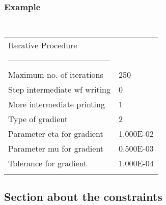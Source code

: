 \documentclass[a4paper,11pt]{article}
\begin{document}
\subsubsection*{Example}
\begin{center}
\tt
\begin{tabular}{|ll|}
\hline
Iterative Procedure           &          \\
-------------------------------------- & \\
Maximum no. of iterations     &250       \\
Step intermediate wf writing  &0         \\
More intermediate printing    &1         \\
Type of gradient              &2         \\
Parameter eta for gradient    &1.000E-02 \\
Parameter mu  for gradient    &0.500E-03 \\
Tolerance for gradient        &1.000E-04 \\
                              &          \\
\hline
\end{tabular}
\end{center}

%
%
\subsection{Section about the constraints}
\end{document}
